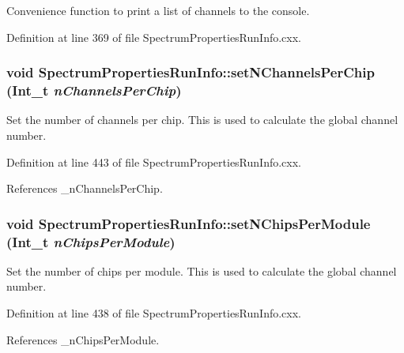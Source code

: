 Convenience function to print a list of channels to the console. 

Definition at line 369 of file SpectrumPropertiesRunInfo.cxx.\hypertarget{class_spectrum_properties_run_info_aee98003379da6688bd2e2cfca86b8ebc}{
\subsubsection[{setNChannelsPerChip}]{\setlength{\rightskip}{0pt plus 5cm}void SpectrumPropertiesRunInfo::setNChannelsPerChip (Int\_\-t {\em nChannelsPerChip})}}
\label{class_spectrum_properties_run_info_aee98003379da6688bd2e2cfca86b8ebc}


Set the number of channels per chip. This is used to calculate the global channel number. 

Definition at line 443 of file SpectrumPropertiesRunInfo.cxx.

References \_\-nChannelsPerChip.\hypertarget{class_spectrum_properties_run_info_a5436dc62d308bcbea52a034a001e1555}{
\subsubsection[{setNChipsPerModule}]{\setlength{\rightskip}{0pt plus 5cm}void SpectrumPropertiesRunInfo::setNChipsPerModule (Int\_\-t {\em nChipsPerModule})}}
\label{class_spectrum_properties_run_info_a5436dc62d308bcbea52a034a001e1555}


Set the number of chips per module. This is used to calculate the global channel number. 

Definition at line 438 of file SpectrumPropertiesRunInfo.cxx.

References \_\-nChipsPerModule.

